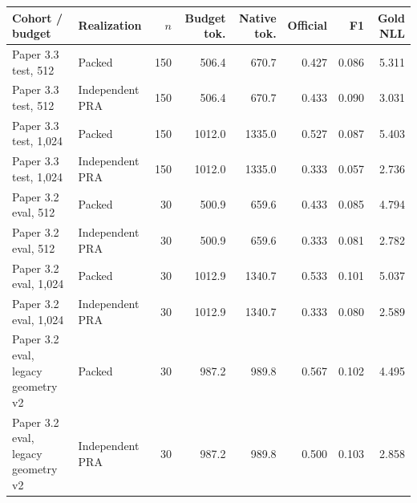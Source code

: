 \begin{tabular}{llrrrrrr}
\toprule
Cohort / budget & Realization & $n$ & Budget tok. & Native tok. & Official & F1 & Gold NLL \\
\midrule
Paper 3.3 test, 512 & Packed & 150 & 506.4 & 670.7 & 0.427 & 0.086 & 5.311 \\
Paper 3.3 test, 512 & Independent PRA & 150 & 506.4 & 670.7 & 0.433 & 0.090 & 3.031 \\
Paper 3.3 test, 1,024 & Packed & 150 & 1012.0 & 1335.0 & 0.527 & 0.087 & 5.403 \\
Paper 3.3 test, 1,024 & Independent PRA & 150 & 1012.0 & 1335.0 & 0.333 & 0.057 & 2.736 \\
Paper 3.2 eval, 512 & Packed & 30 & 500.9 & 659.6 & 0.433 & 0.085 & 4.794 \\
Paper 3.2 eval, 512 & Independent PRA & 30 & 500.9 & 659.6 & 0.333 & 0.081 & 2.782 \\
Paper 3.2 eval, 1,024 & Packed & 30 & 1012.9 & 1340.7 & 0.533 & 0.101 & 5.037 \\
Paper 3.2 eval, 1,024 & Independent PRA & 30 & 1012.9 & 1340.7 & 0.333 & 0.080 & 2.589 \\
Paper 3.2 eval, legacy geometry v2 & Packed & 30 & 987.2 & 989.8 & 0.567 & 0.102 & 4.495 \\
Paper 3.2 eval, legacy geometry v2 & Independent PRA & 30 & 987.2 & 989.8 & 0.500 & 0.103 & 2.858 \\
\bottomrule
\end{tabular}
